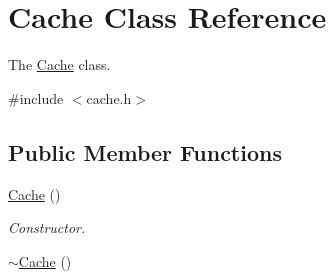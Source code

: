 \hypertarget{classCache}{}\section{Cache Class Reference}
\label{classCache}


The \hyperlink{classCache}{Cache} class.  




{\ttfamily \#include $<$cache.\+h$>$}

\subsection*{Public Member Functions}
\begin{DoxyCompactItemize}
\item 
\hyperlink{classCache_a486f257a48e32d0083f8ae41f78074d1}{Cache} ()\hypertarget{classCache_a486f257a48e32d0083f8ae41f78074d1}{}\label{classCache_a486f257a48e32d0083f8ae41f78074d1}

\begin{DoxyCompactList}\small\item\em Constructor. \end{DoxyCompactList}\item 
\hyperlink{classCache_af8b171a6c49d88d3ba179477484b9d48}{$\sim$\+Cache} ()\hypertarget{classCache_af8b171a6c49d88d3ba179477484b9d48}{}\label{classCache_af8b171a6c49d88d3ba179477484b9d48}


\end{DoxyCompactItemize}

